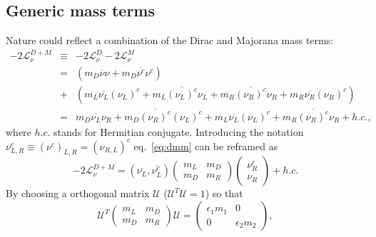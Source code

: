 \subsection{Generic mass terms}
\label{sec:genma}
Nature could reflect a combination of the Dirac and Majorana mass terms:
\begin{equation}
  \label{eq:dmm}
  \begin{array}{ccl}
    -2\mathcal{L}_{\nu}^{D+M} &\equiv& -2\mathcal{L}_{\nu}^{D}     -2\mathcal{L}_{\nu}^{M}\\ &=& \displaystyle{( 
      m_{D}\overline{\nu}\nu +
      m_{D}\overline{\nu^{c}}\nu^{c} )}\\ &+& \displaystyle{(                               m_{L}\overline{\nu_{L}}(\nu_{L})^{c} +                                                     m_{L}\overline{(\nu_{L})^{c}}\nu_{L} +                                           m_{R}\overline{(\nu_{R})^{c}}\nu_{R} +              m_{R}\overline{\nu_{R}}(\nu_{R})^{c})}\\ &=&\displaystyle{
      m_{D}\overline{\nu_{L}}\nu_{R} +
      m_{D}\overline{(\nu_{R})^{c}}(\nu_{L})^{c} +
      m_{L}\overline{\nu_{L}}(\nu_{L})^{c} + 
      m_{R}\overline{(\nu_{R})^{c}}\nu_{R} + h.c.},
  \end{array}
\end{equation}
where $h.c.$ stands for Hermitian conjugate. Introducing the notation $\nu^{c}_{L,R} \equiv (\nu^{c})_{L,R} = (\nu_{R,L})^{c}$ eq.~\ref{eq:dmm} can be reframed as
\begin{equation}
  \label{eq:mm}
  -2\mathcal{L}_{\nu}^{D+M} =       \left(\overline{\nu_{L}},\overline{\nu^{c}_{L}}\right)
  \left(\begin{array}{cc}m_L & m_D \\ m_D & m_R\end{array}\right)
  \left(\begin{array}{c}\nu^{c}_R \\ \nu_R\end{array}\right) + h.c.
\end{equation}
By choosing a orthogonal matrix $\mathcal{U}$ ($\mathcal{U}^{T}
\mathcal{U} = 1$) so that
\begin{equation}
  \label{eq:mmat}
  \mathcal{U}^{T}\left(\begin{array}{cc}m_L & m_D \\ m_D &       
m_R\end{array}\right)\mathcal{U} = 
  \left(\begin{array}{cc}\epsilon_{1}m_1 & 0 \\ 0 &            
\epsilon_{2}m_2\end{array}\right),
\end{equation}
